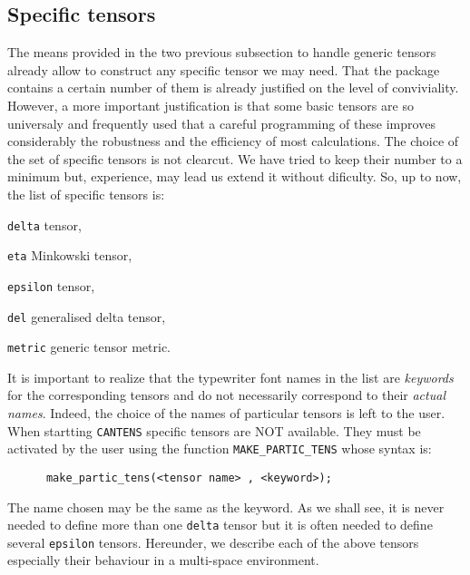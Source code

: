 \subsection{Specific tensors}
The means provided in the two previous subsection to handle generic tensors
already allow to construct any specific tensor we may need.  That the package contains
a certain number of them  is already justified on the level of conviviality.
However, a more important justification is that some basic tensors are so
universaly and frequently used that a careful programming of these improves
considerably the robustness and the efficiency of most calculations.
The choice of the set of specific tensors is not clearcut. We have tried
to keep their number to a minimum but, experience, may lead us extend it
without dificulty. So, up to now, the list of specific tensors is:
\begin{list}{-}{\parsep 0in \itemsep 1pt}
\item \texttt{delta} tensor,
\item \texttt{eta} Minkowski tensor,
\item \texttt{epsilon} tensor,
\item \texttt{del} generalised delta tensor,
\item \texttt{metric} generic tensor metric.
\end{list}
It is important to realize that the typewriter font names in the list are
\emph{keywords} for the corresponding tensors and do not necessarily correspond
to their \emph{actual names}.
Indeed, the choice of the names of particular tensors is left to the user.
When startting \texttt{CANTENS} specific tensors are NOT
available.
They must be activated by the user using the function
\texttt{MAKE\_PARTIC\_TENS} whose syntax is:
\begin{verbatim}
      make_partic_tens(<tensor name> , <keyword>);
\end{verbatim}
The name chosen may be the same as the keyword.
As we shall see, it is never needed to define more than one \texttt{delta}
tensor but it is often needed to define several \texttt{epsilon} tensors.
Hereunder, we describe each of the above tensors especially their
behaviour in a multi-space environment.

